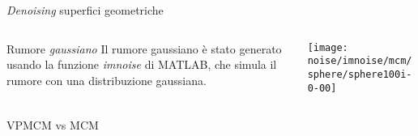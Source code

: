 \begin{frame}{\emph{Denoising} superfici geometriche}
 \begin{columns}[T]
   \begin{column}{4cm}
     \begin{block}{Rumore \emph{gaussiano}}
       Il rumore gaussiano è stato generato usando la funzione
       \emph{imnoise} di MATLAB, che simula il rumore con una distribuzione
       gaussiana.
     \end{block}
     \end{column}
   \begin{column}[T]{6cm}
     \texttt{[image: noise/imnoise/mcm/sphere/sphere100i-0-00]}
   \end{column}
 \end{columns}
\end{frame}

\begin{frame}{VPMCM vs MCM}
 \begin{columns}[T]
  \begin{column}{5cm}
    \centering
    \end{column}
  \begin{column}[T]{5cm}
    \centering
    \end{column}
 \end{columns}
\begin{columns}[T]
  \begin{column}{5cm}
    \centering
    \end{column}
  \begin{column}[T]{5cm}
    \centering
    \end{column}
  \end{columns}
\end{frame}

